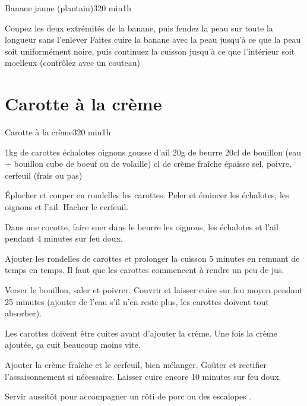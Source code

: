 {\begin{recette}{Banane jaune (plantain)}{3}{20 min}{1h}
\begin{preparation}
\etape Coupez les deux extrémités de la banane, puis fendez la peau sur toute la longueur sans l'enlever
\etape Faites cuire la banane avec la peau jusqu'à ce que la peau soit uniformément noire, puis continuez la cuisson jusqu'à ce que l'intérieur soit moelleux (contrôlez avec un couteau)
\end{preparation}
\end{recette}

\section{Carotte à la crème}
\begin{recette}{Carotte à la crème}{3}{20 min}{1h}
\begin{ingredients}
\ingredient 1kg de carottes
 échalotes
 oignons
 gousse d'ail
\ingredient 20g de beurre
\ingredient 20cl de bouillon (eau + bouillon cube de boeuf ou de volaille)
 cl de crème fraîche épaisse
\ingredient sel, poivre, cerfeuil (frais ou pas)
\end{ingredients}

\begin{preparation}
\etape Éplucher et couper en rondelles les carottes. Peler et émincer les échalotes, les oignons et l’ail. Hacher le cerfeuil.

\etape Dans une cocotte, faire suer dans le beurre les oignons, les échalotes et l’ail pendant 4 minutes sur feu doux.

\etape Ajouter les rondelles de carottes et prolonger la cuisson 5 minutes en remuant de temps en temps. Il faut que les 
carottes commencent à rendre un peu de jus.

\etape Verser le bouillon, saler et poivrer. Couvrir et laisser cuire sur feu moyen pendant 25 minutes (ajouter de l'eau s'il 
n'en reste plus, les carottes doivent tout absorber).

\begin{remarque}
Les carottes doivent être cuites avant d'ajouter la crème. Une fois la crème ajoutée, ça cuit beaucoup moins vite.
\end{remarque}

\etape Ajouter la crème fraîche et le cerfeuil, bien mélanger. Goûter et rectifier l’assaisonnement si nécessaire. Laisser cuire 
encore 10 minutes sur feu doux.

\etape Servir aussitôt pour accompagner un rôti de porc ou des escalopes .
\end{preparation}
\end{recette}

}

